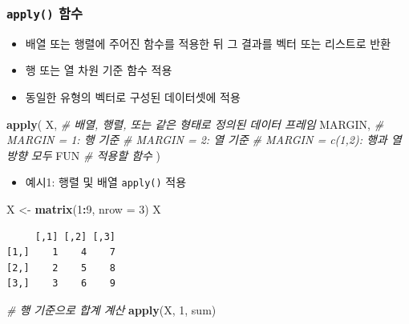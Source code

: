 \documentclass[
  11pt,
]{krantz}
\newenvironment{Shaded}{\begin{snugshade}}{\end{snugshade}}
\newcommand{\CommentTok}[1]{\textcolor[rgb]{0.37,0.37,0.37}{\textit{#1}}}
\newcommand{\DataTypeTok}[1]{\textcolor[rgb]{0.27,0.27,0.27}{#1}}
\newcommand{\DecValTok}[1]{\textcolor[rgb]{0.06,0.06,0.06}{#1}}
\newcommand{\KeywordTok}[1]{\textcolor[rgb]{0.27,0.27,0.27}{\textbf{#1}}}
\newcommand{\NormalTok}[1]{#1}
\newcommand{\OperatorTok}[1]{\textcolor[rgb]{0.43,0.43,0.43}{\textbf{#1}}}
\newcommand{\StringTok}[1]{\textcolor[rgb]{0.5,0.5,0.5}{#1}}
\providecommand{\tightlist}{%
  \setlength{\itemsep}{0pt}\setlength{\parskip}{0pt}}
\begin{document}
\hypertarget{apply}{%
\subsubsection*{\texorpdfstring{\texttt{apply()} 함수}{apply() 함수}}\label{apply}}


\begin{itemize}
\tightlist
\item
  배열 또는 행렬에 주어진 함수를 적용한 뒤 그 결과를 벡터 또는 리스트로 반환
\item
  행 또는 열 차원 기준 함수 적용
\item
  동일한 유형의 벡터로 구성된 데이터셋에 적용
\end{itemize}

\footnotesize

\begin{Shaded}
\begin{Highlighting}[]
\KeywordTok{apply}\NormalTok{(}
\NormalTok{  X, }\CommentTok{# 배열, 행렬, 또는 같은 형태로 정의된 데이터 프레임}
\NormalTok{  MARGIN, }\CommentTok{# MARGIN = 1: 행 기준}
          \CommentTok{# MARGIN = 2: 열 기준}
          \CommentTok{# MARGIN = c(1,2): 행과 열 방향 모두}
\NormalTok{  FUN }\CommentTok{# 적용할 함수 }
\NormalTok{  )}
\end{Highlighting}
\end{Shaded}

\normalsize

\begin{itemize}
\tightlist
\item
  예시1: 행렬 및 배열 \texttt{apply()} 적용
\end{itemize}

\footnotesize

\begin{Shaded}
\begin{Highlighting}[]
\NormalTok{X <-}\StringTok{ }\KeywordTok{matrix}\NormalTok{(}\DecValTok{1}\OperatorTok{:}\DecValTok{9}\NormalTok{, }\DataTypeTok{nrow =} \DecValTok{3}\NormalTok{)}
\NormalTok{X}
\end{Highlighting}
\end{Shaded}

\begin{verbatim}
     [,1] [,2] [,3]
[1,]    1    4    7
[2,]    2    5    8
[3,]    3    6    9
\end{verbatim}

\begin{Shaded}
\begin{Highlighting}[]
\CommentTok{# 행 기준으로 합계 계산}
\KeywordTok{apply}\NormalTok{(X, }\DecValTok{1}\NormalTok{, sum)}
\end{Highlighting}
\end{Shaded}
\end{document}
